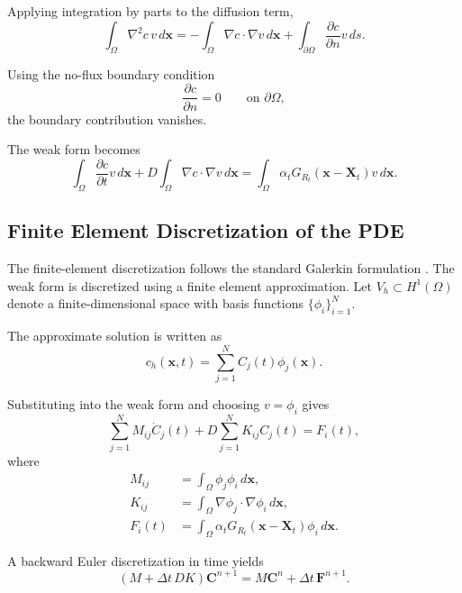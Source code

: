 Applying integration by parts to the diffusion term,
\begin{equation}
\int_{\Omega}
\nabla^2 c\,v\,d\mathbf{x}
=
-\int_{\Omega}
\nabla c\cdot\nabla v\,d\mathbf{x}
+
\int_{\partial\Omega}
\frac{\partial c}{\partial n}v\,ds.
\end{equation}

Using the no-flux boundary condition
\begin{equation}
\frac{\partial c}{\partial n}=0
\qquad
\text{on }\partial\Omega,
\end{equation}
the boundary contribution vanishes.

The weak form becomes
\begin{equation}
\int_{\Omega}
\frac{\partial c}{\partial t}v\,d\mathbf{x}
+
D\int_{\Omega}
\nabla c\cdot\nabla v\,d\mathbf{x}
=
\int_{\Omega}
\alpha_t
G_{R_t}(\mathbf{x}-\mathbf{X}_t)
v\,d\mathbf{x}.
\end{equation}

\subsection{Finite Element Discretization of the PDE}
The finite-element discretization follows the standard Galerkin formulation
\cite{fenics2016}.
The weak form is discretized using a finite element approximation. Let \(V_h\subset H^1(\Omega)\) denote a finite-dimensional space with basis functions \(\{\phi_i\}_{i=1}^N\).

The approximate solution is written as
\begin{equation}
c_h(\mathbf{x},t)
=
\sum_{j=1}^{N}
C_j(t)\phi_j(\mathbf{x}).
\end{equation}

Substituting into the weak form and choosing \(v=\phi_i\) gives
\begin{equation}
\sum_{j=1}^{N}
M_{ij}\dot{C}_j(t)
+
D\sum_{j=1}^{N}
K_{ij}C_j(t)
=
F_i(t),
\end{equation}
where
\begin{align}
M_{ij}
&=
\int_{\Omega}
\phi_j\phi_i\,d\mathbf{x},
\\
K_{ij}
&=
\int_{\Omega}
\nabla\phi_j\cdot\nabla\phi_i\,d\mathbf{x},
\\
F_i(t)
&=
\int_{\Omega}
\alpha_t
G_{R_t}(\mathbf{x}-\mathbf{X}_t)
\phi_i\,d\mathbf{x}.
\end{align}

A backward Euler discretization in time yields
\begin{equation}
\left(
M+\Delta t\,DK
\right)
\mathbf{C}^{n+1}
=
M\mathbf{C}^{n}
+
\Delta t\,\mathbf{F}^{n+1}.
\end{equation}

